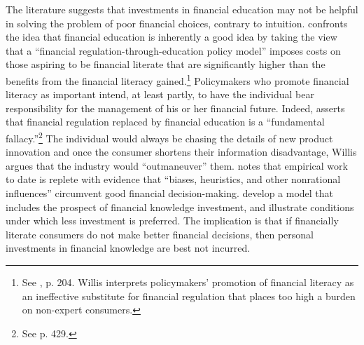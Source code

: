 \documentclass[12pt]{article}
\theoremstyle{plain}
\begin{document}
The literature suggests that investments in financial education may not be helpful in solving the problem of poor financial choices, contrary to intuition.   \cite{willis2008against} confronts the idea that financial education is inherently a good idea by taking the view that a ``financial regulation-through-education policy model'' imposes costs on those aspiring to be financial literate that are significantly higher than the benefits from the financial literacy gained.\footnote{See \cite{willis2008against}, p. 204.  Willis interprets policymakers’ promotion of financial literacy as an ineffective substitute for financial regulation that places too high a burden on non-expert consumers.}   Policymakers who promote financial literacy as important intend, at least partly, to have the individual bear responsibility for the management of his or her financial future.  Indeed, \cite{willis2011financial} asserts that financial regulation replaced by financial education is a ``fundamental fallacy.''\footnote{See \cite{willis2011financial} p. 429.}   The individual would always be chasing the details of new product innovation and once the consumer shortens their information disadvantage, Willis argues that the industry would ``outmaneuver'' them.  \cite{willis2011financial} notes that empirical work to date is replete with evidence that ``biases, heuristics, and other nonrational influences'' circumvent good financial decision-making.   \cite{lusardi2017optimal} develop a model that includes the prospect of financial knowledge investment, and illustrate conditions under which less investment is preferred.    The implication is that if financially literate consumers do not make better financial decisions, then personal investments in financial knowledge are best not incurred.
\end{document}
